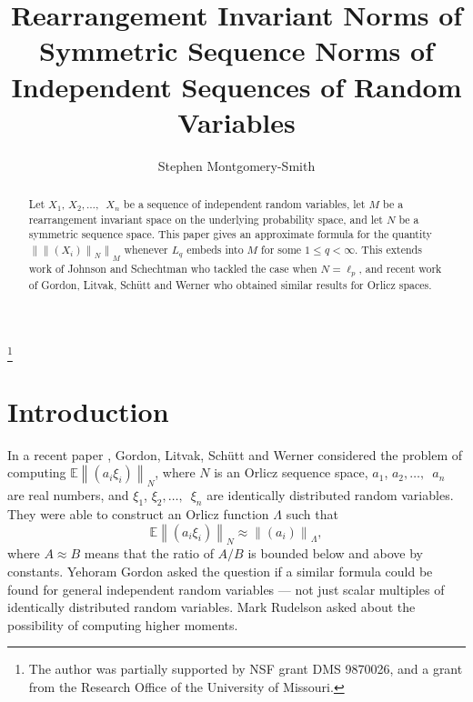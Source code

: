 \documentclass[12pt]{amsart}
\newcommand{\E}{{\mathbb E}}
\newcommand{\normo}[1]{{\left\|#1\right\|}}
\newcommand{\snormo}[1]{{\mathopen\|#1\mathclose\|}}
\begin{document}
\title[R.i. norms of symmetric sequence norms]
{Rearrangement Invariant Norms of Symmetric Sequence Norms
of Independent Sequences of Random Variables
}

\author{Stephen Montgomery-Smith}
\makeatletter
\address{Department of Mathematics\\
University of Missouri\\
Columbia, MO 65211}
\thanks{The author was 
partially supported
by NSF grant DMS 9870026, and a grant from the Research Office of the
University of Missouri.}

\begin{abstract}
\noindent
Let $X_1$, $X_2,\dots,$\ $X_n$ be a sequence of independent random
variables, let $M$ be a rearrangement invariant space on the underlying
probability space, and let $N$ be a symmetric sequence space.  This paper
gives an approximate formula for the quantity
$\snormo{\snormo{(X_i)}_N}_M$ whenever $L_q$ embeds into $M$ for some
$1 \le q < \infty$.
This extends work of Johnson and Schechtman who tackled the case when
$N = \ell_p$, and
recent work of Gordon, Litvak, Sch\"utt and Werner who obtained
similar results for Orlicz spaces.
\end{abstract}

\maketitle

\section{Introduction}

In a recent paper \cite{gordon et al}, Gordon, Litvak, Sch\"utt and Werner
considered the problem of computing $\E \normo{(a_i \xi_i)}_N$, where
$N$ is an Orlicz sequence space, $a_1$, $a_2,\dots,$\ $a_n$ are real numbers, 
and $\xi_1$, $\xi_2,\dots,$\ $\xi_n$ are identically distributed random 
variables.  They were able to construct an Orlicz function $\Lambda$ such
that 
\[ \E \normo{(a_i \xi_i)}_N \approx \snormo{(a_i)}_\Lambda ,\]
where $A \approx B$ means that the ratio of $A/B$ is bounded below
and above by constants.  Yehoram Gordon asked the question if a similar
formula could be found for general independent random variables --- 
not just scalar multiples of identically distributed random variables.
Mark Rudelson asked about the possibility of computing higher moments.
\end{document}
